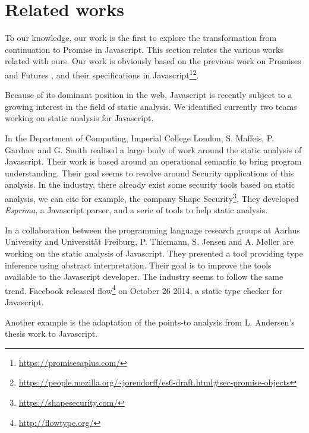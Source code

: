 \section{Related works} \label{section:related}

To our knowledge, our work is the first to explore the transformation from continuation to Promise in Javascript.
This section relates the various works related with ours.
Our work is obviously based on the previous work on Promises and Futures \cite{Liskov1988}, and their specifications in Javascript\footnote{\url{https://promisesaplus.com/}}\footnote{\url{https://people.mozilla.org/~jorendorff/es6-draft.html\#sec-promise-objects}}.

Because of its dominant position in the web, Javascript is recently subject to a growing interest in the field of static analysis.
We identified currently two teams working on static analysis for Javascript.

In the Department of Computing, Imperial College London, S. Maffeis, P. Gardner and G. Smith realised a large body of work around the static analysis of Javascript.
Their work is based around an operational semantic\cite{Maffeis2008} to bring program understanding\cite{Smith2011,Gardner2012,Gardner2013}.
Their goal seems to revolve around Security applications of this analysis\cite{Maffeis2009,Maffeis2009a}.
In the industry, there already exist some security tools based on static analysis, we can cite for example, the company Shape Security\footnote{\url{https://shapesecurity.com/}}.
They developed \textit{Esprima}, a Javascript parser, and a serie of tools to help static analysis.

In a collaboration between the programming language research groups at Aarhus University and Universität Freiburg, P. Thiemann, S. Jensen and A. Møller are working on the static analysis of Javascript.
They presented a tool providing type inference using abstract interpretation\cite{Thiemann2005,Jensen2009,Jensen2012}.
Their goal is to improve the tools available to the Javascript developer\cite{Andreasen}.
The industry seems to follow the same trend.
Facebook released flow\footnote{\url{http://flowtype.org/}} on October 26 2014, a static type checker for Javascript.

Another example is the adaptation of the points-to analysis from L. Andersen's thesis work\cite{Andersen1994} to Javascript\cite{Jang2009}.


